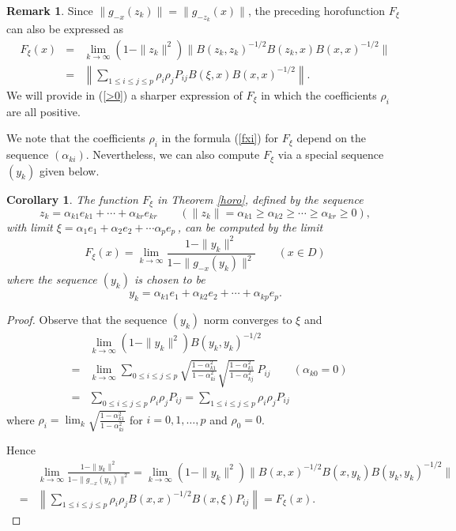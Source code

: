 \documentclass[12pt, twoside]{article}
\newtheorem{corollary}[theorem]{Corollary}
\theoremstyle{definition}
\newtheorem{remark}[theorem]{Remark}
\newtheorem{example}[theorem]{Example}
\numberwithin{equation}{section}
\begin{document}
\begin{remark}\label{reverse}
Since $\|g_{-x}(z_k)\| =\|g_{-z_k}(x)\|$, the preceding  horofunction $F_\xi$ can also be
expressed as
\begin{eqnarray*}
F_\xi(x) &  =&
\lim_{k\rightarrow \infty} (1-\|z_k\|^2)\|B(z_k,z_k)^{-1/2}B(z_k,x)B(x,x)^{-1/2}\| \\
&= & \left\|\sum_{1\leq i\leq j\leq p}\rho_i\rho_jP_{ij}B(\xi, x)B(x,x)^{-1/2}\right\|.
\end{eqnarray*}
We will provide in (\ref{>0}) a sharper expression of $F_\xi$ in which the coefficients
$\rho_i$ are all positive.
\end{remark}


We note that the coefficients $\rho_i$ in the formula (\ref{fxi}) for $F_\xi$
depend on the sequence $(\alpha_{ki})$. Nevertheless,  we can also compute
$F_\xi$ via a special sequence $(y_k)$ given below.

\begin{corollary}\label{anotherseq} The function $F_\xi$ in Theorem \ref{horo}, defined by the sequence
 $$z_k = \alpha_{k1}e_{k1} + \cdots + \alpha_{kr}e_{kr}\qquad (\|z_k\|=\alpha_{k1} \geq \alpha_{k2} \geq \cdots
\geq \alpha_{kr} \geq 0),$$
with limit $\xi = \alpha_1 e_1 + \alpha_2 e_2 + \cdots \alpha_p e_p\,$,
can be computed by the limit
$$F_\xi (x) = \lim_{k\rightarrow \infty} \frac{1-\|y_k\|^2}{1-\|g_{-x}(y_k)\|^2}\qquad (x\in D)$$
where the sequence  $(y_k)$ is chosen to be
$$y_k = \alpha_{k1}e_1 + \alpha_{k2}e_2 + \cdots + \alpha_{kp}e_{p}.$$
\end{corollary}

\begin{proof}
Observe that the sequence $(y_k)$ norm converges to $\xi$ and
\begin{eqnarray*}
&&    \lim_{k\rightarrow \infty} (1-\|y_k\|^2)B(y_k, y_k)^{-1/2}\\ &= &
\lim_{k\rightarrow \infty} \sum_{0\leq i\leq j\leq p}
\sqrt{\frac{1-\alpha_{k1}^2}{1-\alpha_{ki}^2}}
\sqrt{\frac{1-\alpha_{k1}^2}{1-\alpha_{kj}^2}} \,P_{ij} \qquad (\alpha_{k0}=0)\\
&=&  \sum_{0\leq i\leq j\leq p}
\rho_i \rho_j P_{ij}
=  \sum_{1\leq i\leq j\leq p}
\rho_i \rho_j P_{ij}
\end{eqnarray*}
where $\rho_i = \lim_k \sqrt{\frac{1-\alpha_{k1}^2}{1-\alpha_{ki}^2}}$ for $i=0, 1,\ldots, p$ and
$\rho_0=0$.

Hence
\begin{eqnarray*}
&& \lim_{k\rightarrow \infty}  \frac{1- \|y_k\|^2}{1-\|g_{-x}(y_k)\|^2}
= \lim_{k\rightarrow \infty}   (1-\|y_k\|^2)\|B(x,x)^{-1/2}B(x,y_k)B(y_k,y_k)^{-1/2}\| \\
&=& \left\|\sum_{1\leq i\leq j\leq p}\rho_i\rho_jB(x,x)^{-1/2}B(x,\xi)P_{ij}\right\|
= F_\xi(x).
\end{eqnarray*}
\end{proof}
\end{document}
